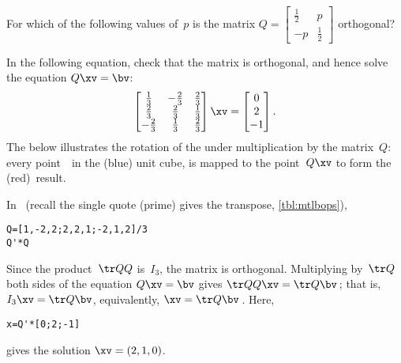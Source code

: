 \begin{activity}
For which of the following values of~\(p\) is the matrix \(Q=\begin{bmatrix} \frac12&p\\-p&\frac12 \end{bmatrix}\) orthogonal?
\end{activity}



\begin{example} \label{eg:3dorthog}
In the following equation, check that the matrix is orthogonal, and hence solve the equation \(Q\xv=\bv\):
\begin{equation*}
\begin{bmatrix} \frac13&-\frac23&\frac23
\\\frac23&\frac23&\frac13
\\-\frac23&\frac13&\frac23 \end{bmatrix}\xv
=\begin{bmatrix} 0\\2\\-1 \end{bmatrix}.
\end{equation*} 
The  below illustrates the rotation of the  under multiplication by the matrix~\(Q\): every point~\xv\ in the (blue) unit cube, is mapped to the point~\(Q\xv\) to form the (red)~result.
\begin{center}
\def\unithousesize{footnotesize,height=5.5cm}
\end{center}
\begin{solution} In \script\ (recall the single quote (prime) gives the transpose, \autoref{tbl:mtlbops}),
\begin{verbatim}
Q=[1,-2,2;2,2,1;-2,1,2]/3
Q'*Q
\end{verbatim}
Since the product~\(\tr QQ\) is~\(I_3\), the matrix is orthogonal.  
Multiplying by~\(\tr Q\) both sides of the equation \(Q\xv=\bv\) gives \(\tr QQ\xv=\tr Q\bv\)\,; that is, \(I_3\xv=\tr Q\bv\), equivalently, \(\xv=\tr Q\bv\)\,.
Here,
\begin{verbatim}
x=Q'*[0;2;-1]
\end{verbatim}
\setbox\ajrqrbox\hbox{}%
\marginpar{\usebox{\ajrqrbox}}%
gives the solution \(\xv=(2,1,0)\).
\end{solution}
\end{example}


